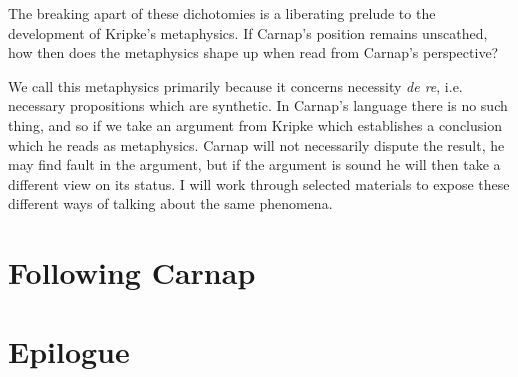 The breaking apart of these dichotomies is a liberating prelude to the development
of Kripke's metaphysics.
If Carnap's position remains unscathed, how then does the metaphysics shape up
when read from Carnap's perspective?

We call this metaphysics primarily because it concerns necessity \emph{de re},
i.e. necessary propositions which are synthetic.
In Carnap's language there is no such thing, and so if we take an
argument from Kripke which establishes a conclusion which he reads as metaphysics.
Carnap will not necessarily dispute the result, he may find fault in the argument,
but if the argument is sound he will then take a different view on its status.
I will work through selected materials to expose these different ways of talking
about the same phenomena.

\chapter{Following Carnap}

\chapter{Epilogue}

\backmatter




\clearpage

\clearpage

\twocolumn[
]
{\small\printindex}

\vfil


